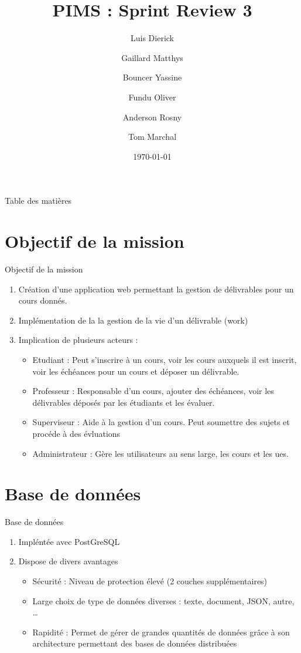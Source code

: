 \documentclass[numbering=fraction,10pt]{beamer}
\title{PIMS : Sprint Review 3}
\author[PIMS]{Luis Dierick \and Gaillard Matthys \and Bouncer Yassine \and Fundu Oliver \and Anderson Rosny \and Tom Marchal }
\institute{Université de Namur}
\date{\today}
\begin{document}
\begin{frame}[plain]{}
    \maketitle
\end{frame}

\begin{frame}{Table des matières}
    \tableofcontents
\end{frame}
\section{Objectif de la mission}
\begin{frame}{Objectif de la mission}
    \begin{enumerate}
        \item Création d'une application web permettant la gestion de délivrables pour un cours donnés.
        \item Implémentation de la la gestion de la vie d'un délivrable (work)
        \item Implication de plusieurs acteurs : 
        \begin{itemize}
            \item Etudiant : Peut s'inscrire à un cours, voir les cours auxquels il est inscrit, voir les échéances pour un cours et déposer un délivrable.
            \item Professeur : Responsable d'un cours, ajouter des échéances, voir les délivrables déposés par les étudiants et les évaluer.
            \item Superviseur : Aide à la gestion d'un cours. Peut soumettre des sujets et procéde à des évluations
            \item Administrateur : Gère les utilisateurs au sens large, les cours et les ues.
        \end{itemize}
    \end{enumerate}
\end{frame}
\section{Base de données}
\begin{frame}{Base de données}
    \begin{enumerate}
        \item Impléntée avec PostGreSQL
        \item Dispose de divers avantages
        \begin{itemize}
            \item Sécurité : Niveau de protection élevé (2 couches supplémentaires)
            \item Large choix de type de données diverses : texte, document, JSON, autre, \dots
            \item Rapidité : Permet de gérer de grandes quantités de données grâce à son architecture permettant des bases de données distribuées
        \end{itemize}
    \end{enumerate}
\end{frame}
\end{document}
